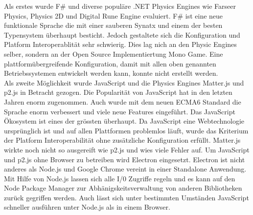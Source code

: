      Als erstes wurde F# und diverse populäre .NET Physics Engines wie Farseer Physics, Physics 2D und Digital Rune Engine evaluiert.
     F# ist eine neue funktionale Sprache die mit einer sauberen Synatx und einem der besten Typensystem überhaupt besticht.
     Jedoch gestaltete sich die Konfiguration und Platform Interoperablität sehr schwierig. Dies lag nich an den Physic Engines selber,
     sondern an der Open Source Implementiertung Mono Game. Eine plattformübergreifende Konfiguration,
     damit mit allen oben genannten Betriebssystemen entwickelt werden kann, konnte nicht erstellt werden.\\
     Als zweite Möglichkeit wurde JavaScript und die Physics Engines Matter.js und p2.js in Betracht gezogen.
     Die Popularität von JavaScript hat in den letzten Jahren enorm zugenommen.
     Auch wurde mit dem neuen ECMA6 Standard die Sprache enorm verbessert und viele neue Features eingeführt. Das JavaScript Ökosystem ist eines der grössten überhaupt.
     Da JavaScript eine Webtechnologie ursprünglich ist und auf allen Plattformen problemlos läuft, wurde das Kriterium der Platform Interoperabilität ohne zusätzliche Konfiguration erfüllt.
     Matter.js wirkte noch nicht so ausgereift wie p2.js und wies viele Fehler auf. Um JavaScript und p2.js ohne Browser zu betreiben wird Electron eingesetzt.
     Electron ist nicht anderes als Node.js und Google Chrome vereint in einer Standalone Anwendung.
     Mit Hilfe von Node.js lassen sich alle I/0 Zugriffe regeln und es kann auf den Node Package Manager zur Abhänigskeitsverwaltung von anderen Bibliotheken zurück gegriffen werden.
     Auch lässt sich unter bestimmten Umständen JavaScript schneller ausführen unter Node.js als in einem Browser.
